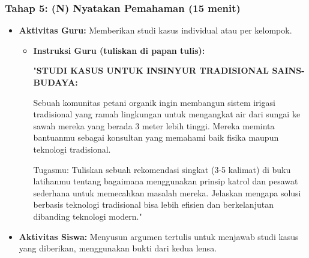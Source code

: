 \documentclass[a4paper,12pt]{article}
\begin{document}
\subsubsection{Tahap 5: (N) Nyatakan Pemahaman (15 menit)}
\begin{itemize}
\item \textbf{Aktivitas Guru:} Memberikan studi kasus individual atau per kelompok.
    \begin{itemize}
    \item \textbf{Instruksi Guru (tuliskan di papan tulis):}
    
    "\textbf{STUDI KASUS UNTUK INSINYUR TRADISIONAL SAINS-BUDAYA:}
    
    Sebuah komunitas petani organik ingin membangun sistem irigasi tradisional yang ramah lingkungan untuk mengangkat air dari sungai ke sawah mereka yang berada 3 meter lebih tinggi. Mereka meminta bantuanmu sebagai konsultan yang memahami baik fisika maupun teknologi tradisional.
    
    Tugasmu: Tuliskan sebuah rekomendasi singkat (3-5 kalimat) di buku latihanmu tentang bagaimana menggunakan prinsip katrol dan pesawat sederhana untuk memecahkan masalah mereka. Jelaskan mengapa solusi berbasis teknologi tradisional bisa lebih efisien dan berkelanjutan dibanding teknologi modern."
    \end{itemize}
\item \textbf{Aktivitas Siswa:} Menyusun argumen tertulis untuk menjawab studi kasus yang diberikan, menggunakan bukti dari kedua lensa.
\end{itemize}
\end{document}
